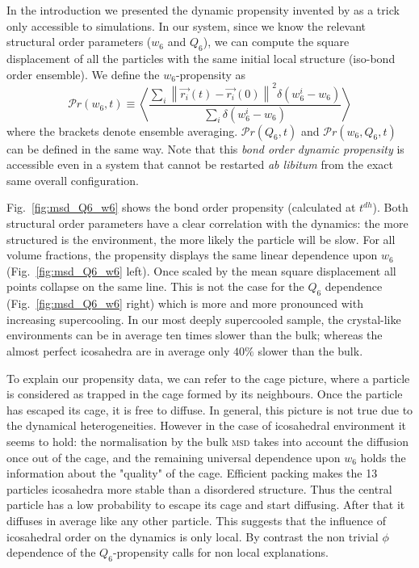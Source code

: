 \documentclass[11pt,a4paper]{article}
\begin{document}
In the introduction we presented the dynamic propensity invented by \citet{Widmer-Cooper2005} as a trick only accessible to simulations. In our system, since we know the relevant structural order parameters ($w_6$ and $Q_6$), we can compute the square displacement of all the particles with the same initial local structure (iso-bond order ensemble). We define the $w_6$-propensity as
\begin{equation}
	\mathcal{P}r(w_6, t) \equiv \left\langle \frac{
		\sum\limits_i{
			\left\|\vec{r_i}(t)-\vec{r_i}(0)\right\|^2 \delta(w_6^i-w_6)
			}
	}{
		\sum\limits_i{\delta(w_6^i-w_6)}
	}\right\rangle 
	\label{eq:bo_propensity}
\end{equation}
where the brackets denote ensemble averaging. $\mathcal{P}r(Q_6, t)$ and $\mathcal{P}r(w_6, Q_6, t)$ can be defined in the same way. Note that this \emph{bond order dynamic propensity} is accessible even in a system that cannot be restarted \emph{ab libitum} from the exact same overall configuration.

Fig.~\ref{fig:msd_Q6_w6} shows the bond order propensity (calculated at $t^{dh}$). Both structural order parameters have a clear correlation with the dynamics: the more structured is the environment, the more likely the particle will be slow. For all volume fractions, the propensity displays the same linear dependence upon $w_6$ (Fig.~\ref{fig:msd_Q6_w6} left). Once scaled by the mean square displacement all points collapse on the same line. This is not the case for the $Q_6$ dependence (Fig.~\ref{fig:msd_Q6_w6} right) which is more and more pronounced with increasing supercooling. In our most deeply supercooled sample, the crystal-like environments can be in average ten times slower than the bulk; whereas the almost perfect icosahedra are in average only $40\%$ slower than the bulk.

To explain our propensity data, we can refer to the cage picture, where a particle is considered as trapped in the cage formed by its neighbours. Once the particle has escaped its cage, it is free to diffuse. In general, this picture is not true due to the dynamical heterogeneities. However in the case of icosahedral environment it seems to hold: the normalisation by the bulk \textsc{msd} takes into account the diffusion once out of the cage, and the remaining universal dependence upon $w_6$ holds the information about the "quality" of the cage. Efficient packing makes the 13 particles icosahedra more stable than a disordered structure. Thus the central particle has a low probability to escape its cage and start diffusing. After that it diffuses in average like any other particle. This suggests that the influence of icosahedral order on the dynamics is only local. By contrast the non trivial $\phi$ dependence of the $Q_6$-propensity calls for non local explanations.
\end{document}
